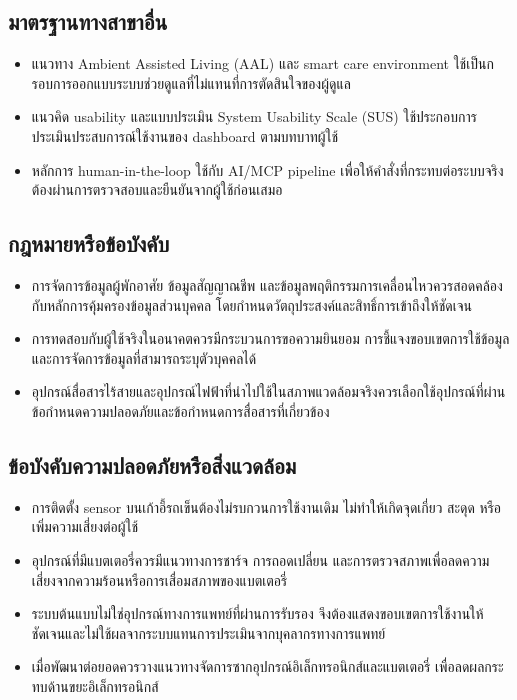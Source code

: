 \subsection*{มาตรฐานทางสาขาอื่น}
\begin{itemize}
    \item แนวทาง Ambient Assisted Living (AAL) และ smart care environment ใช้เป็นกรอบการออกแบบระบบช่วยดูแลที่ไม่แทนที่การตัดสินใจของผู้ดูแล 
    \item แนวคิด usability และแบบประเมิน System Usability Scale (SUS) ใช้ประกอบการประเมินประสบการณ์ใช้งานของ dashboard ตามบทบาทผู้ใช้ 
    \item หลักการ human-in-the-loop ใช้กับ AI/MCP pipeline เพื่อให้คำสั่งที่กระทบต่อระบบจริงต้องผ่านการตรวจสอบและยืนยันจากผู้ใช้ก่อนเสมอ 
\end{itemize}

\subsection*{กฎหมายหรือข้อบังคับ}
\begin{itemize}
    \item การจัดการข้อมูลผู้พักอาศัย ข้อมูลสัญญาณชีพ และข้อมูลพฤติกรรมการเคลื่อนไหวควรสอดคล้องกับหลักการคุ้มครองข้อมูลส่วนบุคคล โดยกำหนดวัตถุประสงค์และสิทธิ์การเข้าถึงให้ชัดเจน 
    \item การทดสอบกับผู้ใช้จริงในอนาคตควรมีกระบวนการขอความยินยอม การชี้แจงขอบเขตการใช้ข้อมูล และการจัดการข้อมูลที่สามารถระบุตัวบุคคลได้ 
    \item อุปกรณ์สื่อสารไร้สายและอุปกรณ์ไฟฟ้าที่นำไปใช้ในสภาพแวดล้อมจริงควรเลือกใช้อุปกรณ์ที่ผ่านข้อกำหนดความปลอดภัยและข้อกำหนดการสื่อสารที่เกี่ยวข้อง 
\end{itemize}

\subsection*{ข้อบังคับความปลอดภัยหรือสิ่งแวดล้อม}
\begin{itemize}
    \item การติดตั้ง sensor บนเก้าอี้รถเข็นต้องไม่รบกวนการใช้งานเดิม ไม่ทำให้เกิดจุดเกี่ยว สะดุด หรือเพิ่มความเสี่ยงต่อผู้ใช้ 
    \item อุปกรณ์ที่มีแบตเตอรี่ควรมีแนวทางการชาร์จ การถอดเปลี่ยน และการตรวจสภาพเพื่อลดความเสี่ยงจากความร้อนหรือการเสื่อมสภาพของแบตเตอรี่ 
    \item ระบบต้นแบบไม่ใช่อุปกรณ์ทางการแพทย์ที่ผ่านการรับรอง จึงต้องแสดงขอบเขตการใช้งานให้ชัดเจนและไม่ใช้ผลจากระบบแทนการประเมินจากบุคลากรทางการแพทย์ 
    \item เมื่อพัฒนาต่อยอดควรวางแนวทางจัดการซากอุปกรณ์อิเล็กทรอนิกส์และแบตเตอรี่ เพื่อลดผลกระทบด้านขยะอิเล็กทรอนิกส์ 
\end{itemize}

